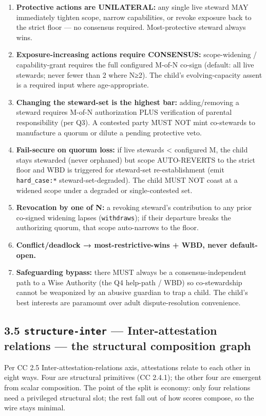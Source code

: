 \documentclass[11pt]{article}
\begin{document}
\begin{enumerate}\setlength\itemsep{0pt}
\item \textbf{Protective actions are UNILATERAL:} any single live steward MAY immediately tighten scope, narrow capabilities, or revoke exposure back to the strict floor — no consensus required. Most-protective steward always wins.
\item \textbf{Exposure-increasing actions require CONSENSUS:} scope-widening / capability-grant requires the full configured M-of-N co-sign (default: all live stewards; never fewer than 2 where N≥2). The child's evolving-capacity assent is a required input where age-appropriate.
\item \textbf{Changing the steward-set is the highest bar:} adding/removing a steward requires M-of-N authorization PLUS verification of parental responsibility (per Q3). A contested party MUST NOT mint co-stewards to manufacture a quorum or dilute a pending protective veto.
\item \textbf{Fail-secure on quorum loss:} if live stewards < configured M, the child stays stewarded (never orphaned) but scope AUTO-REVERTS to the strict floor and WBD is triggered for steward-set re-establishment (emit \texttt{hard\_case:*} steward-set-degraded). The child MUST NOT coast at a widened scope under a degraded or single-contested set.
\item \textbf{Revocation by one of N:} a revoking steward's contribution to any prior co-signed widening lapses (\texttt{withdraws}); if their departure breaks the authorizing quorum, that scope auto-narrows to the floor.
\item \textbf{Conflict/deadlock → most-restrictive-wins + WBD, never default-open.}
\item \textbf{Safeguarding bypass:} there MUST always be a consensus-independent path to a Wise Authority (the Q4 help-path / WBD) so co-stewardship cannot be weaponized by an abusive guardian to trap a child. The child's best interests are paramount over adult dispute-resolution convenience.
\end{enumerate}


\subsection*{3.5 \texttt{structure-inter} — Inter-attestation relations — the structural composition graph}


Per CC 2.5 Inter-attestation-relations axis, attestations relate to each other in eight ways. Four are structural primitives (CC 2.4.1); the other four are emergent from scalar composition. The point of the split is economy: only four relations need a privileged structural slot; the rest fall out of how scores compose, so the wire stays minimal.
\end{document}
